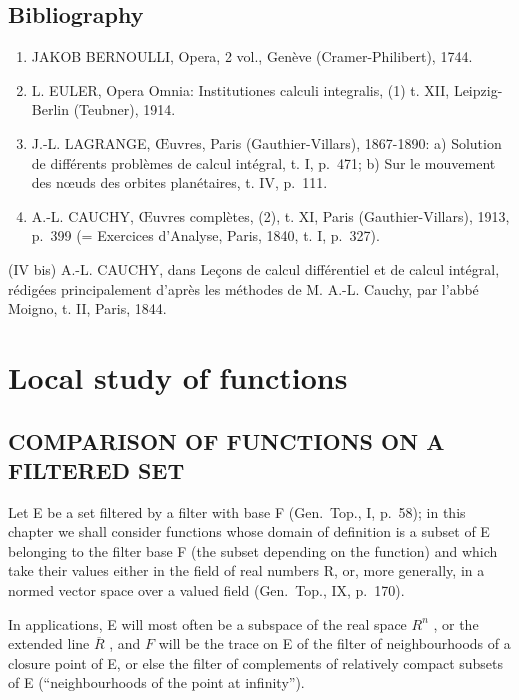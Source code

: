 \section*{Bibliography}
{}

\begin{enumerate}
\def\labelenumi{(\Roman{enumi})}
\item
  JAKOB BERNOULLI, Opera, 2 vol., Genève (Cramer-Philibert), 1744.
\item
  L. EULER, Opera Omnia: Institutiones calculi integralis, (1) t. XII, Leipzig-Berlin (Teubner), 1914.
\item
  J.-L. LAGRANGE, Œuvres, Paris (Gauthier-Villars), 1867-1890: a) Solution de différents problèmes de calcul intégral, t. I, p.~471; b) Sur le mouvement des nœuds des orbites planétaires, t. IV, p.~111.
\item
  A.-L. CAUCHY, Œuvres complètes, (2), t. XI, Paris (Gauthier-Villars), 1913, p.~399 (= Exercices d'Analyse, Paris, 1840, t. I, p.~327).
\end{enumerate}

(IV bis) A.-L. CAUCHY, dans Leçons de calcul différentiel et de calcul intégral, rédigées principalement d'après les méthodes de M. A.-L. Cauchy, par l'abbé Moigno, t. II, Paris, 1844.

\chapter{Local study of functions}

\section{COMPARISON OF FUNCTIONS ON A FILTERED SET}

Let E be a set filtered by a filter with base F (Gen.~Top., I, p.~58); in this chapter we shall consider functions whose domain of definition is a subset of E belonging to the filter base F (the subset depending on the function) and which take their values either in the field of real numbers R, or, more generally, in a normed vector space over a valued field (Gen.~Top., IX, p.~170).

In applications, E will most often be a subspace of the real space \(R^{n}\) , or the extended line \(\overline{R}\) , and \(F\) will be the trace on E of the filter of neighbourhoods of a closure point of E, or else the filter of complements of relatively compact subsets of E (``neighbourhoods of the point at infinity'').

